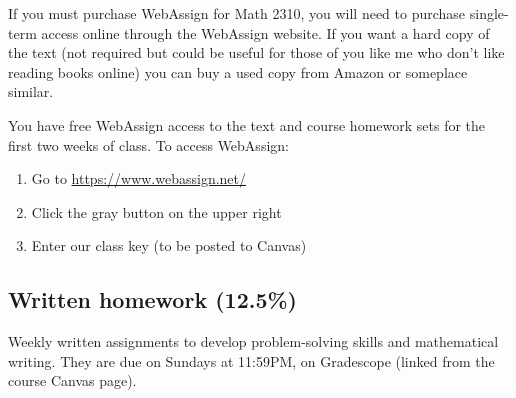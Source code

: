\documentclass[oneside,11pt]{amsart}
\begin{document}
If you must purchase WebAssign for Math 2310, you will need to purchase single-term access online through the WebAssign website. If you want a hard copy of the text (not required but could be useful for those of you like me who don't like reading books online) you can buy a used copy from Amazon or someplace similar.

You have free WebAssign access to the text and course homework sets for the first two weeks of class. To access WebAssign:

\begin{enumerate}
    \item Go to \url{https://www.webassign.net/}
    \item Click the gray button on the upper right
		\item Enter our class key (to be posted to Canvas)
\end{enumerate}


\subsection{Written homework (12.5\%)} Weekly written assignments to develop problem-solving skills and mathematical writing. They are due on Sundays at 11:59PM, on Gradescope (linked from the course Canvas page).
\end{document}
